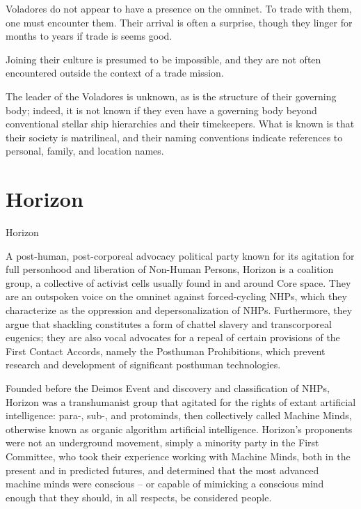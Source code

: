 Voladores do not appear to have a presence on the omninet. To trade with them, one must  
encounter them. Their arrival is often a surprise, though they linger for months to years if trade is  
seems good.  
 

Joining their culture is presumed to be impossible, and they are not often encountered outside  
the context of a trade mission. 
 

The leader of the Voladores is unknown, as is the structure of their governing body; indeed, it is  
not known if they even have a governing body beyond conventional stellar ship hierarchies and  
their timekeepers. What is known is that their society is matrilineal, and their naming conventions  
indicate references to personal, family, and location names. 
 
\section{Horizon}
Horizon   

A post-human, post-corporeal advocacy political party known for its agitation for full personhood  
and liberation of Non-Human Persons, Horizon is a coalition group, a collective of activist cells  
usually found in and around Core space. They are an outspoken voice on the omninet against  
forced-cycling NHPs, which they characterize as the oppression and depersonalization of NHPs.  
Furthermore, they argue that shackling constitutes a form of chattel slavery and transcorporeal  
eugenics; they are also vocal advocates for a repeal of certain provisions of the First Contact  
Accords, namely the Posthuman Prohibitions, which prevent research and development of  
significant posthuman technologies. 
 

Founded before the Deimos Event and discovery and classification of NHPs, Horizon was a  
transhumanist group that agitated for the rights of extant artificial intelligence: para-, sub-, and  
protominds, then collectively called Machine Minds, otherwise known as organic algorithm  
artificial intelligence. Horizon’s proponents were not an underground movement, simply a  
minority party in the First Committee, who took their experience working with Machine Minds,  
both in the present and in predicted futures, and determined that the most advanced machine  
minds were conscious -- or capable of mimicking a conscious mind enough that they should, in  
all respects, be considered people.
 

                                                                                                          


